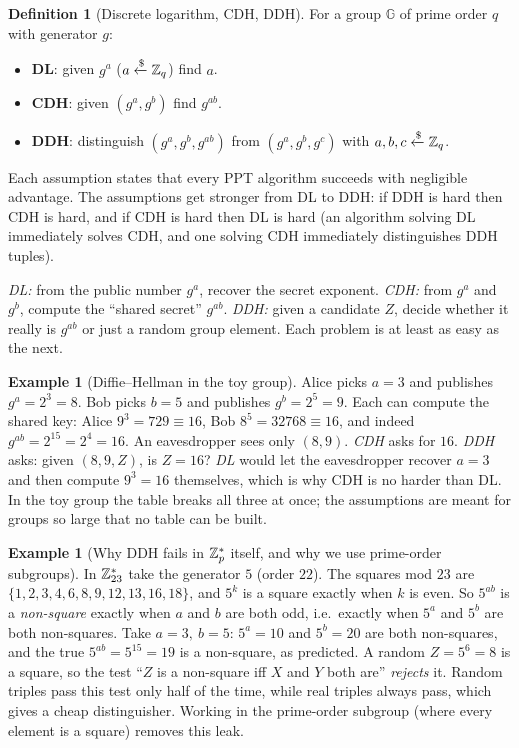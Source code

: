 \documentclass[11pt,a4paper]{report}
\theoremstyle{plain}
\theoremstyle{definition}
\newtheorem{definition}[theorem]{Definition}
\newtheorem{example}[theorem]{Example}
\theoremstyle{remark}
\newcommand{\GG}{\mathbb{G}}
\newcommand{\getsr}{\xleftarrow{\$}}
\newcommand{\Zs}[1]{\ZZ_{#1}^{*}}
\begin{document}
\begin{definition}[Discrete logarithm, CDH, DDH]
For a group $\GG$ of prime order $q$ with generator $g$:
\begin{itemize}
\item \textbf{DL}: given $g^a$ ($a\getsr\ZZ_q$) find $a$.
\item \textbf{CDH}: given $(g^a,g^b)$ find $g^{ab}$.
\item \textbf{DDH}: distinguish $(g^a,g^b,g^{ab})$ from $(g^a,g^b,g^c)$ with $a,b,c\getsr\ZZ_q$.
\end{itemize}
Each assumption states that every PPT algorithm succeeds with negligible advantage. The assumptions get stronger from DL to DDH: if DDH is hard then CDH is hard, and if CDH is hard then DL is hard (an algorithm solving DL immediately solves CDH, and one solving CDH immediately distinguishes DDH tuples).
\end{definition}
\begin{plain}\PE
\emph{DL:} from the public number $g^a$, recover the secret exponent. \emph{CDH:} from $g^a$ and $g^b$, compute the ``shared secret'' $g^{ab}$. \emph{DDH:} given a candidate $Z$, decide whether it really is $g^{ab}$ or just a random group element. Each problem is at least as easy as the next.
\end{plain}
\begin{example}[Diffie--Hellman in the toy group]
Alice picks $a=3$ and publishes $g^a=2^3=8$. Bob picks $b=5$ and publishes $g^b=2^5=9$. Each can compute the shared key: Alice $9^3=729\equiv16$, Bob $8^5=32768\equiv16$, and indeed $g^{ab}=2^{15}=2^4=16$.
An eavesdropper sees only $(8,9)$. \emph{CDH} asks for $16$. \emph{DDH} asks: given $(8,9,Z)$, is $Z=16$? \emph{DL} would let the eavesdropper recover $a=3$ and then compute $9^3=16$ themselves, which is why CDH is no harder than DL. In the toy group the table breaks all three at once; the assumptions are meant for groups so large that no table can be built.
\end{example}
\begin{example}[Why DDH fails in $\Zs p$ itself, and why we use prime-order subgroups]\label{ex:ddh-fails}
In $\Zs{23}$ take the generator $5$ (order $22$). The squares mod $23$ are $\{1,2,3,4,6,8,9,12,13,16,18\}$, and $5^k$ is a square exactly when $k$ is even. So $5^{ab}$ is a \emph{non-square} exactly when $a$ and $b$ are both odd, i.e.\ exactly when $5^a$ and $5^b$ are both non-squares.
Take $a=3,\ b=5$: $5^a=10$ and $5^b=20$ are both non-squares, and the true $5^{ab}=5^{15}=19$ is a non-square, as predicted. A random $Z=5^6=8$ is a square, so the test ``$Z$ is a non-square iff $X$ and $Y$ both are'' \emph{rejects} it. Random triples pass this test only half of the time, while real triples always pass, which gives a cheap distinguisher. Working in the prime-order subgroup (where every element is a square) removes this leak.
\end{example}
\end{document}
